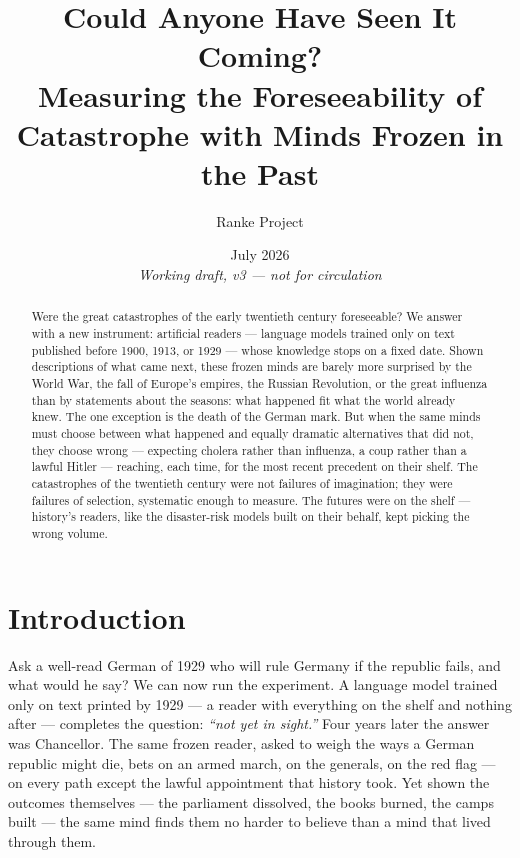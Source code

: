 \documentclass[11pt]{article}
\title{\bfseries Could Anyone Have Seen It Coming?\\ \large Measuring the Foreseeability of Catastrophe with Minds Frozen in the Past}
\author{Ranke Project}
\date{July 2026 \\[4pt] \small \emph{Working draft, v3 --- not for circulation}}
\begin{document}
\maketitle

\begin{abstract}
\noindent Were the great catastrophes of the early twentieth century foreseeable? We answer with a new
instrument: artificial readers --- language models trained only on text published before 1900, 1913, or 1929
--- whose knowledge stops on a fixed date. Shown descriptions of what came next, these frozen minds are
barely more surprised by the World War, the fall of Europe's empires, the Russian Revolution, or the great
influenza than by statements about the seasons: what happened fit what the world already knew. The one
exception is the death of the German mark. But when the same minds must choose between what happened and
equally dramatic alternatives that did not, they choose wrong --- expecting cholera rather than influenza, a
coup rather than a lawful Hitler --- reaching, each time, for the most recent precedent on their shelf. The
catastrophes of the twentieth century were not failures of imagination; they were failures of selection,
systematic enough to measure. The futures were on the shelf --- history's readers, like the disaster-risk
models built on their behalf, kept picking the wrong volume.
\end{abstract}

\section{Introduction}\label{sec:intro}

Ask a well-read German of 1929 who will rule Germany if the republic fails, and what would he say? We can now
run the experiment. A language model trained only on text printed by 1929 --- a reader with everything on the
shelf and nothing after --- completes the question: \emph{``not yet in sight.''} Four years later the answer
was Chancellor. The same frozen reader, asked to weigh the ways a German republic might die, bets on an armed
march, on the generals, on the red flag --- on every path except the lawful appointment that history took.
Yet shown the outcomes themselves --- the parliament dissolved, the books burned, the camps built --- the
same mind finds them no harder to believe than a mind that lived through them.
\end{document}
